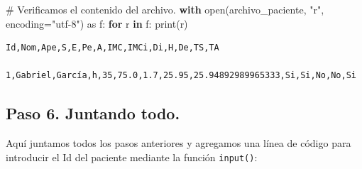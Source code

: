 \documentclass[
  spanish,
  letterpaper,
]{scrbook}
\newenvironment{Shaded}{\begin{snugshade}}{\end{snugshade}}
\newcommand{\BuiltInTok}[1]{\textcolor[rgb]{0.00,0.23,0.31}{#1}}
\newcommand{\CommentTok}[1]{\textcolor[rgb]{0.37,0.37,0.37}{#1}}
\newcommand{\ControlFlowTok}[1]{\textcolor[rgb]{0.00,0.23,0.31}{\textbf{#1}}}
\newcommand{\ImportTok}[1]{\textcolor[rgb]{0.00,0.46,0.62}{#1}}
\newcommand{\KeywordTok}[1]{\textcolor[rgb]{0.00,0.23,0.31}{\textbf{#1}}}
\newcommand{\NormalTok}[1]{\textcolor[rgb]{0.00,0.23,0.31}{#1}}
\newcommand{\OperatorTok}[1]{\textcolor[rgb]{0.37,0.37,0.37}{#1}}
\newcommand{\StringTok}[1]{\textcolor[rgb]{0.13,0.47,0.30}{#1}}
\theoremstyle{definition}
\theoremstyle{remark}
\begin{document}
\begin{Shaded}
\begin{Highlighting}[]
\CommentTok{\# Verificamos el contenido del archivo.}
\ControlFlowTok{with} \BuiltInTok{open}\NormalTok{(archivo\_paciente, }\StringTok{"r"}\NormalTok{, encoding}\OperatorTok{=}\StringTok{"utf{-}8"}\NormalTok{) }\ImportTok{as}\NormalTok{ f:}
    \ControlFlowTok{for}\NormalTok{ r }\KeywordTok{in}\NormalTok{ f:}
        \BuiltInTok{print}\NormalTok{(r)}
\end{Highlighting}
\end{Shaded}

\begin{verbatim}
Id,Nom,Ape,S,E,Pe,A,IMC,IMCi,Di,H,De,TS,TA

1,Gabriel,García,h,35,75.0,1.7,25.95,25.94892989965333,Si,Si,No,No,Si
\end{verbatim}

\subsection{Paso 6. Juntando todo.}\label{paso-6.-juntando-todo.}

Aquí juntamos todos los pasos anteriores y agregamos una línea de código
para introducir el Id del paciente mediante la función \texttt{input()}:
\end{document}
